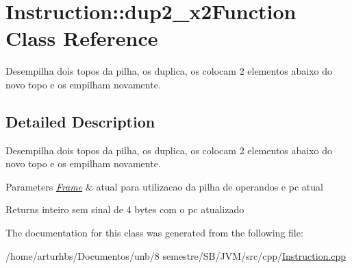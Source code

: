 \hypertarget{classInstruction_1_1dup2__x2Function}{}\section{Instruction\+:\+:dup2\+\_\+x2\+Function Class Reference}
\label{classInstruction_1_1dup2__x2Function}


Desempilha dois topos da pilha, os duplica, os colocam 2 elementos abaixo do novo topo e os empilham novamente.  




\subsection{Detailed Description}
Desempilha dois topos da pilha, os duplica, os colocam 2 elementos abaixo do novo topo e os empilham novamente. 


\begin{DoxyParams}{Parameters}
{\em \hyperlink{classFrame}{Frame}} & atual para utilizacao da pilha de operandos e pc atual \\
\hline
\end{DoxyParams}
\begin{DoxyReturn}{Returns}
inteiro sem sinal de 4 bytes com o pc atualizado 
\end{DoxyReturn}


The documentation for this class was generated from the following file\+:\begin{DoxyCompactItemize}
\item 
/home/arturhbs/\+Documentos/unb/8 semestre/\+S\+B/\+J\+V\+M/src/cpp/\hyperlink{Instruction_8cpp}{Instruction.\+cpp}\end{DoxyCompactItemize}
